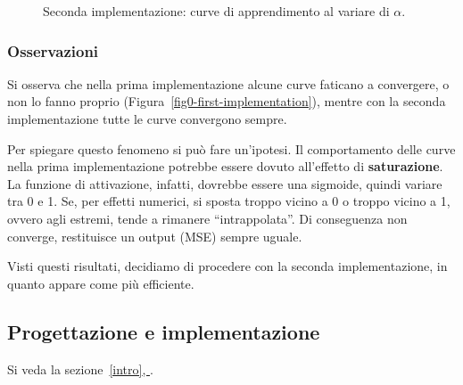 \documentclass[a4paper,12pt]{article}
\renewcommand*{\fullref}[1]{\hyperref[{#1}]{\vref*{#1}, \emph{\nameref*{#1}}}}
\begin{document}
\begin{figure}[htb]
    \centering
    \caption{Seconda implementazione: curve di apprendimento al variare di $\alpha$.}
    \label{fig0-second-implementation}
\end{figure}

\subsubsection{Osservazioni}

Si osserva che nella prima implementazione alcune curve faticano a convergere, o non lo fanno proprio (Figura~\vref{fig0-first-implementation}), mentre con la seconda implementazione tutte le curve convergono sempre.

Per spiegare questo fenomeno si può fare un'ipotesi. Il comportamento delle curve nella prima implementazione potrebbe essere dovuto all'effetto di \textbf{saturazione}. La funzione di attivazione, infatti, dovrebbe essere una sigmoide, quindi variare tra 0 e 1. Se, per effetti numerici, si sposta troppo vicino a 0 o troppo vicino a 1, ovvero agli estremi, tende a rimanere ``intrappolata''. Di conseguenza non converge, restituisce un output (MSE) sempre uguale.

Visti questi risultati, decidiamo di procedere con la seconda implementazione, in quanto appare come più efficiente.



\subsection{Progettazione e implementazione}
Si veda la sezione~\fullref{intro}.
\end{document}
